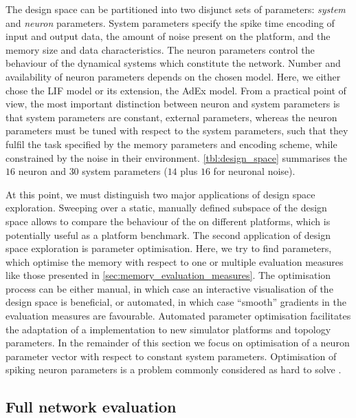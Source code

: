 The \BiNAM design space can be partitioned into two disjunct sets of parameters: \emph{system} and \emph{neuron} parameters. System parameters specify the spike time encoding of input and output data, the amount of noise present on the platform, and the memory size and data characteristics. The neuron parameters \nParams control the behaviour of the dynamical systems which constitute the network. Number and availability of neuron parameters depends on the chosen model. Here, we either chose the \acrfull{LIF} model or its extension, the \acrfull{AdEx} model. From a practical point of view, the most important distinction between neuron and system parameters is that system parameters are constant, external parameters, whereas the neuron parameters \nParams must be tuned with respect to the system parameters, such that they fulfil the task specified by the memory parameters and encoding scheme, while constrained by the noise in their environment. \cref{tbl:design_space} summarises the $16$ neuron and $30$ system parameters ($14$ plus $16$ for neuronal noise).

At this point, we must distinguish two major applications of design space exploration. Sweeping over a static, manually defined subspace of the design space allows to compare the behaviour of the \BiNAM on different platforms, which is potentially useful as a platform benchmark. The second application of design space exploration is parameter optimisation. Here, we try to find parameters, which optimise the memory with respect to one or multiple evaluation measures like those presented in \cref{sec:memory_evaluation_measures}. The optimisation process can be either  manual, in which case an interactive visualisation of the design space is beneficial, or automated, in which case \enquote{smooth} gradients in the evaluation measures are favourable. Automated parameter optimisation facilitates the adaptation of a \BiNAM implementation to new simulator platforms and topology parameters. In the remainder of this section we focus on optimisation of a neuron parameter vector \nParams with respect to constant system parameters. Optimisation of spiking neuron parameters is a problem commonly considered as hard to solve \cite{prinz2007neuronal}.

\subsection{Full network evaluation}

